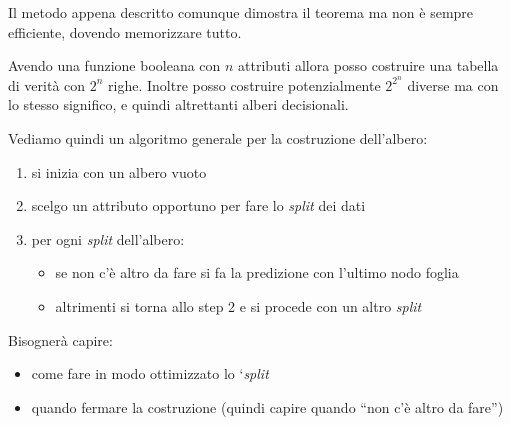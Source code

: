 \documentclass[a4paper,12pt, oneside]{book}
\begin{document}
Il metodo appena descritto comunque dimostra il teorema ma non è sempre
efficiente, dovendo memorizzare tutto.
\begin{teorema}
  Avendo una funzione booleana con $n$ attributi allora posso costruire una
  tabella di verità con $2^n$ righe. Inoltre posso costruire potenzialmente
  $2^{2^n}$ diverse ma con lo stesso significo, e quindi altrettanti alberi
  decisionali.
\end{teorema}
Vediamo quindi un algoritmo generale per la costruzione dell'albero:
\begin{enumerate}
  \item si inizia con un albero vuoto
  \item scelgo un attributo opportuno per fare lo \textit{split} dei dati
  \item per ogni \textit{split} dell'albero:
  \begin{itemize}
    \item se non c'è altro da fare si fa la predizione con l'ultimo nodo foglia
    \item altrimenti si torna allo step 2 e si procede con un altro
    \textit{split}
  \end{itemize}
\end{enumerate}
Bisognerà capire:
\begin{itemize}
  \item come fare in modo ottimizzato lo `\textit{split}
  \item quando fermare la costruzione (quindi capire quando ``non c'è altro da
  fare'')
\end{itemize}
\end{document}
